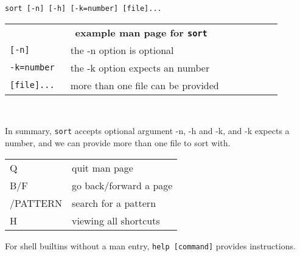 \documentclass[landscape,a0paper,fontscale=0.285]{baposter} %
\begin{document}
\begin{poster}
{\texttt{\small{sort [-n] [-h] [-k=number] [file]...}} \\

\begin{tabular}{p{0.2\linewidth}p{0.7\linewidth}}
 \multicolumn{2}{c}{\textbf{example man page for \texttt{sort}  }} \\
\texttt{\small{[-n]}} & the -n option is optional\\
\texttt{\small{-k=number}} & the -k option expects an number \\
\texttt{\small{[file]...}} & more than one file can be provided \\
\end{tabular}\\

\linebreak

In summary, \texttt{\small{sort}} accepts optional argument -n, -h and -k, and -k expects a number, and we can provide more than one file to sort with.\\



\begin{tabular}{l l}
Q & quit man page\\
B/F & go back/forward a page \\
/PATTERN & search for a pattern \\
H & viewing all shortcuts
\end{tabular}
\newline

For shell builtins without a man entry,
\texttt{\small{help [command]}} provides instructions.
}

\end{poster}
\end{document}
